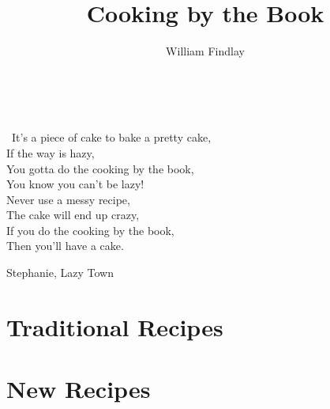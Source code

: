 \documentclass[a4paper,11pt]{memoir}
\title{Cooking by the Book}
\author{William Findlay}
\newcommand\partnote{}
\begin{document}
\maketitle
\thispagestyle{empty}
\newpage
\setcounter{page}{1}

{
  \hypersetup{linkcolor=black}
  \tableofcontents
}

\newpage
\thispagestyle{empty}
\
\vfill
\begin{minipage}{0.7\textwidth}
\epigraph{
\twonotes~It's a piece of cake to bake a pretty cake,\\
If the way is hazy,\\
You gotta do the cooking by the book,\\
You know you can't be lazy!\\
Never use a messy recipe,\\
The cake will end up crazy,\\
If you do the cooking by the book,\\
Then you'll have a cake.~\eighthnote}{Stephanie, Lazy Town}
\end{minipage}
\vfill
\newpage

\setcounter{page}{1}


\renewcommand*{\partnote}{
\epigraph{Tradition is not the worship of ashes, but the preservation of fire.}{Gustav Mahler}
}
\part{Traditional Recipes}



\renewcommand*{\partnote}{
\epigraph{In department stores, so much kitchen equipment is bought indiscriminately by people who just come in for men's underwear. }{Julia Child}
}
\part{New Recipes}





\end{document}

